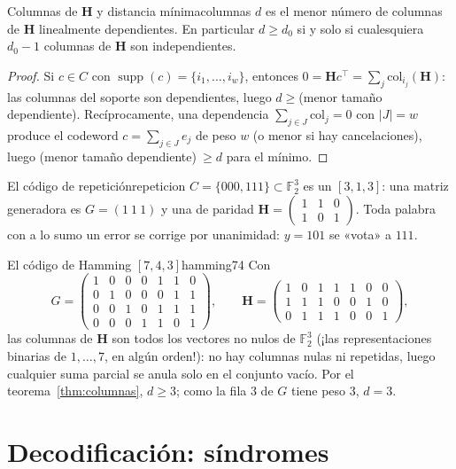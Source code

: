 \documentclass[11pt,a4paper,oneside]{report}
\newcommand{\F}{\mathbb{F}}
\newcommand{\supp}{\operatorname{supp}}
\newcommand{\Hmat}{\mathbf{H}}          %
\newcommand{\Ftwo}{\F_2}
\begin{document}
\begin{teorema}{Columnas de $\Hmat$ y distancia mínima}{columnas}
$d$ es el menor número de columnas de $\Hmat$ linealmente dependientes.
En particular $d\ge d_0$ si y solo si cualesquiera $d_0-1$ columnas de
$\Hmat$ son independientes.
\end{teorema}
\begin{proof}
Si $c\in C$ con $\supp(c)=\{i_1,\dots,i_w\}$, entonces
$0=\Hmat c^{\top}=\sum_{j}\text{col}_{i_j}(\Hmat)$: las columnas del
soporte son dependientes, luego $d\ge{}$(menor tamaño dependiente).
Recíprocamente, una dependencia $\sum_{j\in J}\text{col}_j=0$ con
$|J|=w$ produce el codeword $c=\sum_{j\in J}e_j$ de peso $w$ (o menor si
hay cancelaciones), luego (menor tamaño dependiente)$\ \ge d$ para el
mínimo.
\end{proof}

\begin{ejemplo}{El código de repetición}{repeticion}
$C=\{000,111\}\subset\Ftwo^3$ es un $[3,1,3]$: una matriz generadora es
$G=(1\ 1\ 1)$ y una de paridad
$\Hmat=\begin{pmatrix}1&1&0\\1&0&1\end{pmatrix}$. Toda palabra con a lo
sumo un error se corrige por unanimidad: $y=101$ se «vota» a $111$.
\end{ejemplo}

\begin{ejemplo}{El código de Hamming $[7,4,3]$}{hamming74}
Con
\[
G=\begin{pmatrix}
1&0&0&0&1&1&0\\
0&1&0&0&0&1&1\\
0&0&1&0&1&1&1\\
0&0&0&1&1&0&1
\end{pmatrix},
\qquad
\Hmat=\begin{pmatrix}
1&0&1&1&1&0&0\\
1&1&1&0&0&1&0\\
0&1&1&1&0&0&1
\end{pmatrix},
\]
las columnas de $\Hmat$ son todos los vectores no nulos de $\Ftwo^3$
(¡las representaciones binarias de $1,\dots,7$, en algún orden!): no hay
columnas nulas ni repetidas, luego cualquier suma parcial se anula solo en
el conjunto vacío. Por el teorema~\ref{thm:columnas}, $d\ge 3$; como la
fila 3 de $G$ tiene peso 3, $d=3$.
\end{ejemplo}

\section{Decodificación: síndromes}
\end{document}
